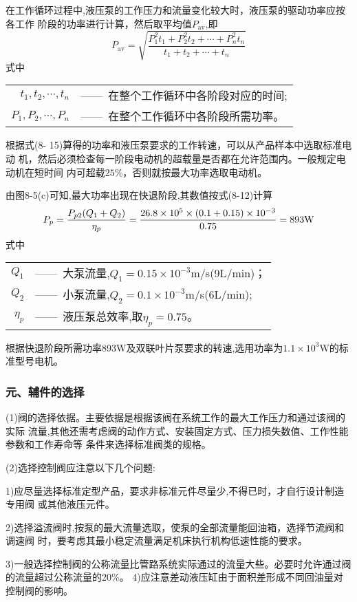 在工作循环过程中,液压泵的工作压力和流量变化较大时，液压泵的驱动功率应按各工作
阶段的功率进行计算，然后取平均值$P_{\text {av}}$,即
\begin{equation}
P_{\text{av}}=\sqrt{\frac{P^2_1t_1+P^2_2t_2+\cdots+P^2_n t_n}{t_1+t_2+\cdots+t_n}}
\end{equation}
\noindent 式中\
\begin{tabular}[t]{rl}
$t_1,t_2,\cdots,t_n$&——\ 在整个工作循环中各阶段对应的时间;\\
$P_1,P_2,\cdots ,P_n$&——\ 在整个工作循环中各阶段所需功率。\\
\end{tabular}
根据式(8- 15)算得的功率和液压泵要求的工作转速，可以从产品样本中选取标准电动
机，然后必须检查每一阶段电动机的超载量是否都在允许范围内。一般规定电动机在短时间
内可超载$25\%$，否则就按最大功率选取电动机。

由图8-5(c)可知,最大功率出现在快退阶段,其数值按式(8-12)计算\\
$$P_p=\frac{P_{p2}(Q_1+Q_2)}{\eta _p}=\frac{26.8\times 10^5\times(0.1+0.15)\times10^{-3} }{0.75}=893\text W$$
\noindent 式中\
\begin{tabular}[t]{rl}
$Q_1$&——\ 大泵流量,$Q_1=0.15\times 10^{-3}$m/s(9L/min)；\\
$Q_2$&——\ 小泵流量,$Q_2=0.1\times 10^{-3}$m/s(6L/min);\\
$\eta_p$&——\ 液压泵总效率,取$\eta_p=0.75$。
\end{tabular}

根据快退阶段所需功率893W及双联叶片泵要求的转速,选用功率为$1.1\times10^3$W的标准型号电机。

\subsubsection* {元、辅件的选择}
(1)阀的选择依据。主要依据是根据该阀在系统工作的最大工作压力和通过该阀的实际
流量,其他还需考虑阀的动作方式、安装固定方式、压力损失数值、工作性能参数和工作寿命等
条件来选择标准阀类的规格。

(2)选择控制阀应注意以下几个问题:

1)应尽量选择标准定型产品，要求非标准元件尽量少,不得已时，才自行设计制造专用阀
或其他液压元件。

2)选择溢流阀时,按泵的最大流量选取，使泵的全部流量能回油箱，选择节流阀和调速阀
时，要考虑其最小稳定流量满足机床执行机构低速性能的要求。

3)一般选择控制阀的公称流量比管路系统实际通过的流量大些。必要时允许通过阀
的流量超过公称流量的20\%。
4)应注意差动液压缸由于面积差形成不同回油量对控制阀的影响。


